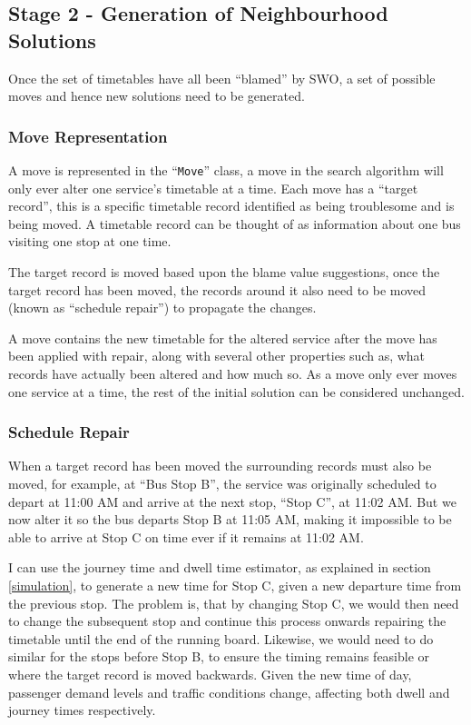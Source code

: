 \documentclass{article}
\begin{document}
\subsection{Stage 2 - Generation of Neighbourhood Solutions}
Once the set of timetables have all been ``blamed'' by SWO, a set of possible moves and hence new solutions need to be generated.



\subsubsection{Move Representation}

A move is represented in the ``\texttt{Move}'' class, a move in the search algorithm will only ever alter one service's timetable at a time. Each move has a ``target record'', this is a specific timetable record identified as being troublesome and is being moved. A timetable record can be thought of as information about one bus visiting one stop at one time.

\par 
The target record is moved based upon the blame value suggestions, once the target record has been moved, the records around it also need to be moved (known as ``schedule repair'') to propagate the changes.

\par 
A move contains the new timetable for the altered service after the move has been applied with repair, along with several other properties such as, what records have actually been altered and how much so. As a move only ever moves one service at a time, the rest of the initial solution can be considered unchanged. 

\subsubsection{Schedule Repair}

When a target record has been moved the surrounding records must also be moved, for example, at ``Bus Stop B'', the service was originally scheduled to depart at 11:00 AM and arrive at the next stop, ``Stop C'', at 11:02 AM. But we now alter it so the bus departs Stop B at 11:05 AM, making it impossible to be able to arrive at Stop C on time ever if it remains at 11:02 AM. 


\par 
I can use the journey time and dwell time estimator, as explained in section \ref{simulation}, to generate a new time for Stop C, given a new departure time from the previous stop. The problem is, that by changing Stop C, we would then need to change the subsequent stop and continue this process onwards repairing the timetable until the end of the running board. Likewise, we would need to do similar for the stops before Stop B, to ensure the timing remains feasible or where the target record is moved backwards. Given the new time of day, passenger demand levels and traffic conditions change, affecting both dwell and journey times respectively.  
\end{document}
